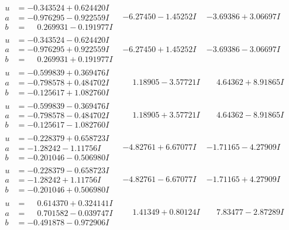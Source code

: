 \documentclass[1p]{elsarticle_modified}
\theoremstyle{definition}
\begin{document}
$$\begin{array}{c|c|c}
\begin{aligned}
u &= -0.343524 + 0.624420 I \\
a &= -0.976295 - 0.922559 I \\
b &= \phantom{-}0.269931 - 0.191977 I\end{aligned}
 & -6.27450 - 1.45252 I & -3.69386 + 3.06697 I \\ \hline\begin{aligned}
u &= -0.343524 - 0.624420 I \\
a &= -0.976295 + 0.922559 I \\
b &= \phantom{-}0.269931 + 0.191977 I\end{aligned}
 & -6.27450 + 1.45252 I & -3.69386 - 3.06697 I \\ \hline\begin{aligned}
u &= -0.599839 + 0.369476 I \\
a &= -0.798578 + 0.484702 I \\
b &= -0.125617 + 1.082760 I\end{aligned}
 & \phantom{-}1.18905 - 3.57721 I & \phantom{-}4.64362 + 8.91865 I \\ \hline\begin{aligned}
u &= -0.599839 - 0.369476 I \\
a &= -0.798578 - 0.484702 I \\
b &= -0.125617 - 1.082760 I\end{aligned}
 & \phantom{-}1.18905 + 3.57721 I & \phantom{-}4.64362 - 8.91865 I \\ \hline\begin{aligned}
u &= -0.228379 + 0.658723 I \\
a &= -1.28242 - 1.11756 I \\
b &= -0.201046 - 0.506980 I\end{aligned}
 & -4.82761 + 6.67077 I & -1.71165 - 4.27909 I \\ \hline\begin{aligned}
u &= -0.228379 - 0.658723 I \\
a &= -1.28242 + 1.11756 I \\
b &= -0.201046 + 0.506980 I\end{aligned}
 & -4.82761 - 6.67077 I & -1.71165 + 4.27909 I \\ \hline\begin{aligned}
u &= \phantom{-}0.614370 + 0.324141 I \\
a &= \phantom{-}0.701582 - 0.039747 I \\
b &= -0.491878 - 0.972906 I\end{aligned}
 & \phantom{-}1.41349 + 0.80124 I & \phantom{-}7.83477 - 2.87289 I \\ \hline\begin{aligned}

\end{aligned}
\end{array}$$
\end{document}
